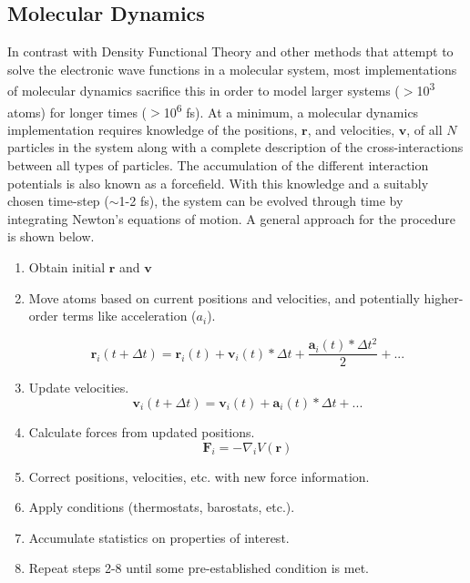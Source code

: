 \subsection{Molecular Dynamics}
In contrast with Density Functional Theory and other methods that attempt to
solve the electronic wave functions in a molecular system, most
implementations of molecular dynamics sacrifice this 
in order to model larger systems ($>$10\textsuperscript{3}
atoms) for longer times ($>$10\textsuperscript{6} fs). At a minimum, a molecular dynamics
implementation requires knowledge of the positions, $\mathbf{r}$, and
velocities, $\mathbf{v}$, of all $N$ particles in the system along with a
complete description of the cross-interactions between all types of particles.
The accumulation of the different interaction potentials is also known as a
forcefield. With this knowledge and a suitably chosen time-step ($\sim$1-2
fs), the system can be evolved through time by integrating Newton's equations
of motion. A general approach for the procedure is shown below.

\begin{enumerate}
\item Obtain initial $\mathbf{r}$ and $\mathbf{v}$

\item Move atoms based on current positions and velocities, and potentially
higher-order terms like acceleration ($a_i$).

\begin{equation*}
\mathbf{r}_i(t + \Delta t) = \mathbf{r}_i(t) + \mathbf{v}_i(t)*\Delta t + \frac{\mathbf{a}_i(t)*\Delta t^2}{2} + ...
\end{equation*}

\item Update velocities.
\begin{equation*}
\mathbf{v}_i(t + \Delta t) = \mathbf{v}_i(t) + \mathbf{a}_i(t)*\Delta t + ...
\end{equation*}

\item Calculate forces from updated positions.
\begin{equation*}
\mathbf{F}_i = -\nabla_i V(\mathbf{r})
\end{equation*}

\item Correct positions, velocities, etc. with new force information.
\item Apply conditions (thermostats, barostats, etc.).
\item Accumulate statistics on properties of interest.
\item Repeat steps 2-8 until some pre-established condition is met.
\end{enumerate}

